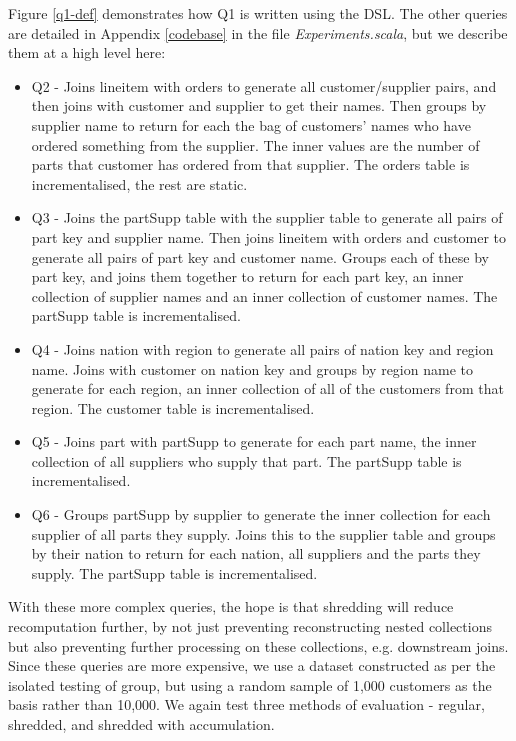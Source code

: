 Figure \ref{q1-def} demonstrates how Q1 is written using the DSL. The other queries are detailed in Appendix \ref{codebase} in the file \textit{Experiments.scala}, but we describe them at a high level here:

\begin{itemize}
\item{Q2 - Joins lineitem with orders to generate all customer/supplier pairs, and then joins with customer and supplier to get their names. Then groups by supplier name to return for each the bag of customers' names who have ordered something from the supplier. The inner values are the number of parts that customer has ordered from that supplier. The orders table is incrementalised, the rest are static.}
\item{Q3 - Joins the partSupp table with the supplier table to generate all pairs of part key and supplier name. Then joins lineitem with orders and customer to generate all pairs of part key and customer name. Groups each of these by part key, and joins them together to return for each part key, an inner collection of supplier names and an inner collection of customer names. The partSupp table is incrementalised.}
\item{Q4 - Joins nation with region to generate all pairs of nation key and region name. Joins with customer on nation key and groups by region name to generate for each region, an inner collection of all of the customers from that region. The customer table is incrementalised.}
\item{Q5 - Joins part with partSupp to generate for each part name, the inner collection of all suppliers who supply that part. The partSupp table is incrementalised.}
\item{Q6 - Groups partSupp by supplier to generate the inner collection for each supplier of all parts they supply. Joins this to the supplier table and groups by their nation to return for each nation, all suppliers and the parts they supply. The partSupp table is incrementalised.}
\end{itemize}

With these more complex queries, the hope is that shredding will reduce recomputation further, by not just preventing reconstructing nested collections but also preventing further processing on these collections, e.g. downstream joins. Since these queries are more expensive, we use a dataset constructed as per the isolated testing of group, but using a random sample of 1,000 customers as the basis rather than 10,000. We again test three methods of evaluation - regular, shredded, and shredded with accumulation.

